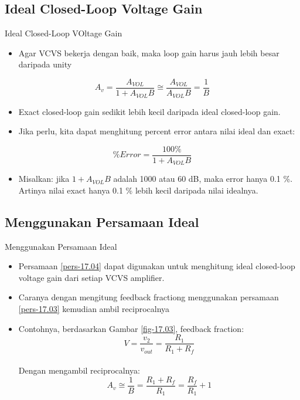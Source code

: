 \subsection{Ideal Closed-Loop Voltage Gain}
\begin{frame}{Ideal Closed-Loop VOltage Gain}
	\begin{itemize}
		\item Agar VCVS bekerja dengan baik, maka loop gain harus jauh lebih besar daripada unity
	\end{itemize}

	\begin{equation}\label{pers-17.04}
		A_v = \frac{A_{VOL}}{1 + A_{VOL} B} \cong \frac{A_{VOL}}{A_{VOL} B} = \frac{1}{B}
	\end{equation}
	
	\begin{itemize}
		\item Exact closed-loop gain sedikit lebih kecil daripada ideal closed-loop gain.
		\item Jika perlu, kita dapat menghitung percent error antara nilai ideal dan exact:
	\end{itemize}

	\begin{equation}\label{pers-17.05}
		\% Error = \frac{100\%}{1 + A_{VOL} B}
	\end{equation}

	\begin{itemize}
		\item Misalkan: jika $ 1 + A_{VOL}B $ adalah 1000 atau 60 dB, maka error hanya 0.1 \%. Artinya nilai exact hanya 0.1 \% lebih kecil daripada nilai idealnya.
	\end{itemize}
\end{frame}

\subsection{Menggunakan Persamaan Ideal}
\begin{frame}{Menggunakan Persamaan Ideal}
	\begin{itemize}
		\item Persamaan \ref{pers-17.04} dapat digunakan untuk menghitung ideal closed-loop voltage gain dari setiap VCVS amplifier.
		\item Caranya dengan mengitung feedback fractiong menggunakan persamaan \ref{pers-17.03} kemudian ambil reciprocalnya
		\item Contohnya, berdasarkan Gambar \ref{fig-17.03}, feedback fraction:
		\begin{equation}\label{pers-17.06}
			V = \frac{v_2}{v_{out}} = \frac{R_1}{R_1 + R_f}
		\end{equation}\\
		Dengan mengambil reciprocalnya:
		\[ A_v \cong \frac{1}{B} = \frac{R_1 + R_f}{R_1} = \frac{R_f}{R_1} + 1 \]
	\end{itemize}
\end{frame}

